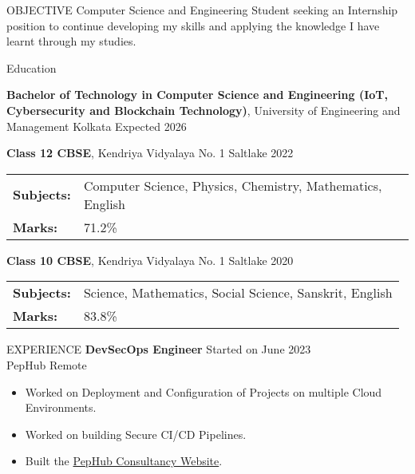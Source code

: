 \documentclass{resume}
\begin{document}
\vspace{0.8em}

\begin{rSection}{OBJECTIVE}
{Computer Science and Engineering Student seeking an Internship position to continue developing my skills and applying the knowledge I have learnt through my studies.}

\end{rSection}
\vspace{0.8em}
\begin{rSection}{Education}

{\bf Bachelor of Technology in Computer Science and Engineering (IoT, Cybersecurity and Blockchain Technology)}, University of Engineering and Management Kolkata \hfill {Expected 2026}\\
\vspace{0.8em}

{\bf Class 12 CBSE}, Kendriya Vidyalaya No. 1 Saltlake \hfill {2022}\\
\begin{tabular}{>{\bfseries}l l}
Subjects: & Computer Science, Physics, Chemistry, Mathematics, English \\
Marks: & 71.2\%
\end{tabular}

{\bf Class 10 CBSE}, Kendriya Vidyalaya No. 1 Saltlake \hfill {2020}
\begin{tabular}{>{\bfseries}l l}
Subjects: & Science, Mathematics, Social Science, Sanskrit, English \\
Marks: & 83.8\%
\end{tabular}
\end{rSection}
\vspace{0.8em}

\begin{rSection}{EXPERIENCE}
    {\bf DevSecOps Engineer} \hfill {Started on June 2023}\\
    PepHub \hfill {Remote}
    \begin{itemize}
        \item {Worked on Deployment and Configuration of Projects on multiple Cloud Environments.}

        \item {Worked on building Secure CI/CD Pipelines.}

        \item {Built the {\href{https://consultancy.pephub.tech}{PepHub Consultancy Website}}.}
    \end{itemize}
\end{rSection}
\end{document}
